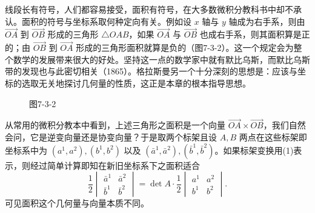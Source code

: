 线段长有符号，人们都容易接受，面积有符号，在大多数微积分教科书中却不承认。面积的符号与坐标系取何种定向有关。例如设 $x$ 轴与 $y$ 轴成为右手系，则由 $\overrightarrow{OA}$ 到 $\overrightarrow{OB}$ 形成的三角形 $\triangle OAB$，如果 $\overrightarrow{OA}$ 与 $\overrightarrow{OB}$ 也成右手系，则其面积算是正的；由 $\overrightarrow{OB}$ 到 $\overrightarrow{OA}$ 形成的三角形面积就算是负的（图7-3-2）。这一个规定会为整个数学的发展带来很大的好处。坚持这一点的数学家中就有默比乌斯，而默比乌斯带的发现也与此密切相关（1865）。格拉斯曼另一个十分深刻的思想是：应该与坐标的选取无关地探讨几何量的性质，这正是本章的根本指导思想。

\begin{figure}[htbp]
\centering
{}
\caption*{图7-3-2}
\end{figure}

从常用的微积分教本中看到，上述三角形之面积是一个向量 $\overrightarrow{OA}\times\overrightarrow{OB}$，我们自然会问，它是逆变向量还是协变向量？于是取两个标架且设 $A,B$ 两点在这些标架即坐标系中为 $(a^1,a^2),(b^1,b^2)$ 以及 $(\bar a^1,\bar a^2),(\bar b^1,\bar b^2)$。如果标架变换用(1)表示，则经过简单计算即知在新旧坐标系下之面积适合
\[
 \frac12\begin{vmatrix}\bar a^1&\bar a^2\\\bar b^1&\bar b^2\end{vmatrix}
 =\det A\cdot\frac12\begin{vmatrix}a^1&a^2\\b^1&b^2\end{vmatrix}.
\]
可见面积这个几何量与向量本质不同。

